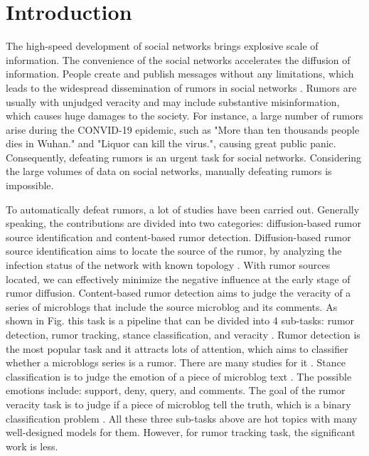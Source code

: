 \section{Introduction}
\label{sec:introduction}
The high-speed development of social networks brings explosive scale of information. The convenience of the social networks accelerates the diffusion of information. People create and publish messages without any limitations, which leads to the widespread dissemination of rumors in social networks \cite{DBLP:journals/corr/KurkaGZ15, DBLP:journals/csur/ZubiagaABLP18, DBLP:conf/sirocco/KostkaOW08, vosoughi2018spread}. Rumors are usually with unjudged veracity and may include substantive misinformation, which causes huge damages to the society. For instance, a large number of rumors arise during the CONVID-19 epidemic, such as "More than ten thousands people dies in Wuhan." and "Liquor can kill the virus.", causing great public panic. Consequently, defeating rumors is an urgent task for social networks. Considering the large volumes of data on social networks, manually defeating rumors is impossible. 

To automatically defeat rumors, a lot of studies have been carried out. Generally speaking, the contributions are divided into two categories:  diffusion-based rumor source identification and content-based rumor detection. Diffusion-based rumor source identification aims to locate the source of the rumor, by analyzing the infection status of the network with known topology \cite{DBLP:conf/sigmetrics/ShahZ10, DBLP:journals/tit/ShahZ11, DBLP:conf/kdd/LappasTGM10}. With rumor sources located, we can effectively minimize the negative influence at the early stage of rumor diffusion. Content-based rumor detection aims to judge the veracity of a series of microblogs that include the source microblog and its comments. As shown in Fig. this task is a pipeline that can be divided into 4 sub-tasks: rumor detection, rumor tracking, stance classification, and veracity \cite{DBLP:journals/csur/ZubiagaABLP18, DBLP:conf/coling/KochkinaLZ18}. Rumor detection is the most popular task and it attracts lots of attention, which aims to classifier whether a microblogs series is a rumor. There are many studies for it \cite{DBLP:conf/socinfo/ZubiagaLP17, DBLP:conf/www/Ma0W19,DBLP:conf/naacl/NguyenDCD19, DBLP:journals/corr/abs-1906-05659}. Stance classification is to judge the emotion of a piece of microblog text \cite{DBLP:conf/semeval/EnayetE17, DBLP:conf/semeval/X17a, DBLP:conf/coling/ZubiagaKLPL16}. The possible emotions include: support, deny, query, and comments. The goal of the rumor veracity task is to judge if a piece of microblog tell the truth, which is a binary classification problem \cite{DBLP:conf/coling/KochkinaLZ18, DBLP:conf/acl/LiZS19, DBLP:conf/acl/KumarC19}. All these three sub-tasks above are hot topics with many well-designed models for them. However, for rumor tracking task, the significant work is less.

